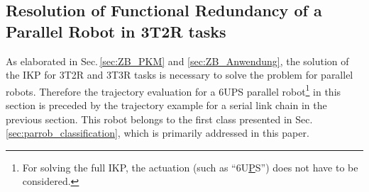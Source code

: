 \documentclass[robotics,article,submit,moreauthors,pdftex]{Definitions/mdpi}
\newcommand{\bm}[1]{\boldsymbol{#1}}
\newcommand{\transp}[0]{{\mathrm{T}}}
\begin{document}
\subsection{Resolution of Functional Redundancy of a Parallel Robot in 3T2R tasks}
\label{sec:Ergebnisse_IK_Parallel}


As elaborated in Sec.\,\ref{sec:ZB_PKM} and \ref{sec:ZB_Anwendung}, the solution of the IKP for 3T2R and 3T3R tasks is necessary to solve the problem for parallel robots.
Therefore the trajectory evaluation for a 6UPS parallel robot\footnote{For solving the full IKP, the actuation (such as ``6U\underline{P}S'') does not have to be considered.} in this section is preceded by the trajectory example for a serial link chain in the previous section.
This robot belongs to the first class presented in Sec.\,\ref{sec:parrob_classification}, which is primarily addressed in this paper.

\end{document}
